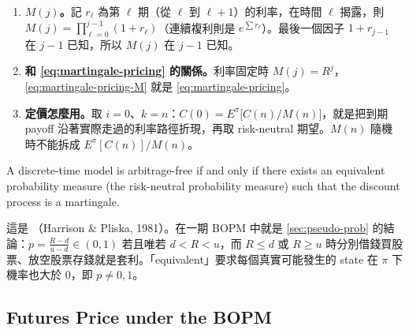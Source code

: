 \suppstart
{}

\begin{remark}
	\begin{enumerate}[(1),nosep]
		\item \textbf{$M(j)$。}記 $r_{\ell}$ 為第 $\ell$ 期（從 $\ell$ 到 $\ell+1$）的利率，在時間 $\ell$ 揭露，則 $M(j)=\prod_{\ell=0}^{j-1}(1+r_{\ell})$（連續複利則是 $e^{\sum r_{\ell}}$）。最後一個因子 $1+r_{j-1}$ 在 $j-1$ 已知，所以 $M(j)$ 在 $j-1$ 已知。
		\item \textbf{和 \eqref{eq:martingale-pricing} 的關係。}利率固定時 $M(j)=R^{j}$，\eqref{eq:martingale-pricing-M} 就是 \eqref{eq:martingale-pricing}。
		\item \textbf{定價怎麼用。}取 $i=0$、$k=n$：$C(0)=E^{\pi}\bigl[C(n)/M(n)\bigr]$，就是把到期 payoff 沿著實際走過的利率路徑折現，再取 risk-neutral 期望。$M(n)$ 隨機時不能拆成 $E^{\pi}[C(n)]/M(n)$。
	\end{enumerate}
\end{remark}
\suppend


\begin{theorem}
	\label{thm:ftap}
	A discrete-time model is arbitrage-free if and only if there exists an equivalent probability measure (the risk-neutral probability measure) such that the discount process is a martingale.
\end{theorem}

\suppstart
{}

\begin{note}
	這是 （Harrison \& Pliska, 1981）。在一期 BOPM 中就是 \autoref{sec:pseudo-prob} 的結論：$p=\frac{R-d}{u-d}\in(0,1)$ 若且唯若 $d<R<u$，而 $R\le d$ 或 $R\ge u$ 時分別借錢買股票、放空股票存錢就是套利。「equivalent」要求每個真實可能發生的 state 在 $\pi$ 下機率也大於 $0$，即 $p\ne0,1$。
\end{note}
\suppend

\subsection{Futures Price under the BOPM}

